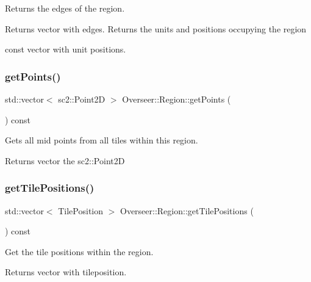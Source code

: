 Returns the edges of the region. 

\begin{DoxyReturn}{Returns}
vector with edges. Returns the units and positions occupying the region

const vector with unit positions. 
\end{DoxyReturn}
\mbox{\label{classOverseer_1_1Region_a9e2a9eaeee365e31aa38528e929772d4}} 
\subsubsection{\texorpdfstring{get\+Points()}{getPoints()}}
{\footnotesize\ttfamily std\+::vector$<$ sc2\+::\+Point2D $>$ Overseer\+::\+Region\+::get\+Points (\begin{DoxyParamCaption}{ }\end{DoxyParamCaption}) const}



Gets all mid points from all tiles within this region. 

\begin{DoxyReturn}{Returns}
vector the sc2\+::\+Point2D 
\end{DoxyReturn}
\mbox{\label{classOverseer_1_1Region_a3977361e7b25ecc320a8a71af13c3f07}} 
\subsubsection{\texorpdfstring{get\+Tile\+Positions()}{getTilePositions()}}
{\footnotesize\ttfamily std\+::vector$<$ Tile\+Position $>$ Overseer\+::\+Region\+::get\+Tile\+Positions (\begin{DoxyParamCaption}{ }\end{DoxyParamCaption}) const}



Get the tile positions within the region. 

\begin{DoxyReturn}{Returns}
vector with tileposition. 
\end{DoxyReturn}
\mbox{\label{classOverseer_1_1Region_ad532499817aecf45c88387a1a775a2fd}} 
